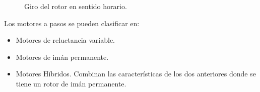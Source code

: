 \begin{figure}[h!]
	\centering
	\caption{Giro del rotor en sentido horario.	\cite{BasicStepper}}
	\label{fig:pasodos}
\end{figure}

Los motores a pasos se pueden clasificar en:
\begin{itemize}
	\item Motores de reluctancia variable.
	
	\item Motores de  imán permanente.
	
	\item Motores Híbridos.
	Combinan las características de los dos anteriores donde se tiene un rotor de imán permanente.
\end{itemize}


